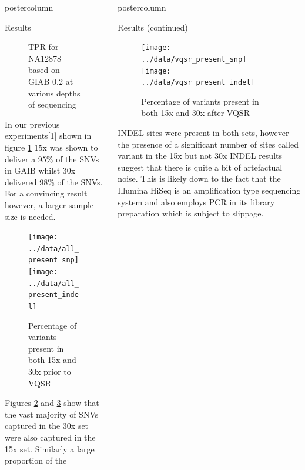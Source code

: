 \documentclass[final,xcolor=table]{beamer}
\begin{document}
\begin{frame}{}
\begin{columns}[t]
\begin{column}{.49\textwidth}
\begin{beamercolorbox}[center,wd=\textwidth]{postercolumn}
\begin{minipage}[T]{.95\textwidth}
\begin{block}{Results}
\begin{figure}
                \caption{TPR for NA12878 based on GIAB 0.2 at various depths of sequencing}
                \label{fig:na12878_ds}
                \end{figure}
{In our previous experiments[1] shown in figure \ref{fig:na12878_ds} 15x was shown to deliver a 95\% of the SNVs in GAIB whilst 30x delivered 98\% of the SNVs. For a convincing result however, a larger sample size is needed.}
                \begin{figure}
                \texttt{[image: ../data/all\_present\_snp]}
                \texttt{[image: ../data/all\_present\_indel]}
                \caption{Percentage of variants present in both 15x and 30x prior to VQSR}
                \label{fig:all_present}
                \end{figure}
{Figures \ref{fig:all_present} and \ref{fig:vqsr_present} show that the vast majority of SNVs captured in the 30x set were also captured in the 15x set. Similarly a large proportion of the}
            \end{block}
            \vfill

            \end{minipage}
        \end{beamercolorbox}
    \end{column}
    \begin{column}{.49\textwidth}
        \begin{beamercolorbox}[center,wd=\textwidth]{postercolumn}
            \begin{minipage}[T]{.95\textwidth}  %

            \begin{block}{Results (continued)}
                \begin{figure}
                \texttt{[image: ../data/vqsr\_present\_snp]}
                \texttt{[image: ../data/vqsr\_present\_indel]}
                \caption{Percentage of variants present in both 15x and 30x after VQSR}
                \label{fig:vqsr_present}
                \end{figure}

                {INDEL sites were present in both sets, however the presence of a significant number of sites called variant in the 15x but not 30x INDEL results suggest that there is quite a bit of artefactual noise. This is likely down to the fact that the Illumina HiSeq is an amplification type sequencing system and also employs PCR in its library preparation which is subject to slippage.}


\end{block}
\end{minipage}
\end{beamercolorbox}
\end{column}
\end{columns}
\end{frame}
\end{document}
